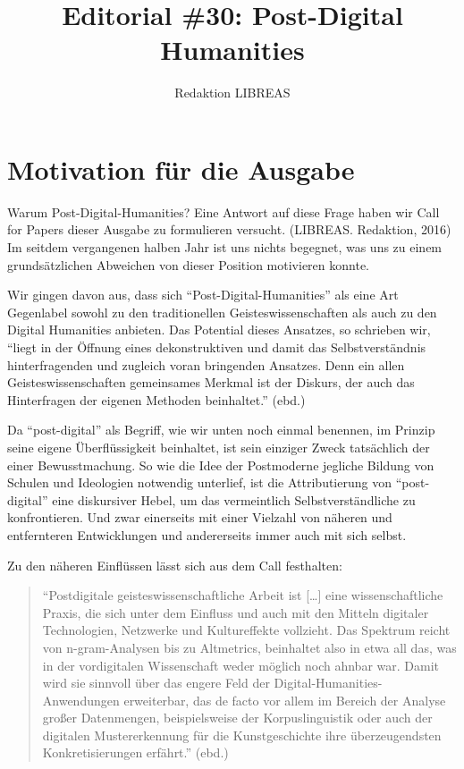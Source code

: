 \documentclass[a4paper,
fontsize=11pt,
oneside,
numbers=noperiodatend,
parskip=half-,
bibliography=totoc,
final
]{scrartcl}
\title{\LARGE{Editorial \#30: Post-Digital Humanities}} %
\author{Redaktion LIBREAS} %
\date{}
\begin{document}
\maketitle
\thispagestyle{fancyplain} 


\section*{Motivation für die
Ausgabe}\label{motivation-fuxfcr-die-ausgabe}

Warum Post-Digital-Humanities? Eine Antwort auf diese Frage haben wir
Call for Papers dieser Ausgabe zu formulieren versucht. (LIBREAS.
Redaktion, 2016) Im seitdem vergangenen halben Jahr ist uns nichts
begegnet, was uns zu einem grundsätzlichen Abweichen von dieser Position
motivieren konnte.

Wir gingen davon aus, dass sich \enquote{Post-Digital-Humanities} als
eine Art Gegenlabel sowohl zu den traditionellen Geisteswissenschaften
als auch zu den Digital Humanities anbieten. Das Potential dieses
Ansatzes, so schrieben wir, \enquote{liegt in der Öffnung eines
dekonstruktiven und damit das Selbstverständnis hinterfragenden und
zugleich voran bringenden Ansatzes. Denn ein allen Geisteswissenschaften
gemeinsames Merkmal ist der Diskurs, der auch das Hinterfragen der
eigenen Methoden beinhaltet.} (ebd.)

Da \enquote{post-digital} als Begriff, wie wir unten noch einmal
benennen, im Prinzip seine eigene Überflüssigkeit beinhaltet, ist sein
einziger Zweck tatsächlich der einer Bewusstmachung. So wie die Idee der
Postmoderne jegliche Bildung von Schulen und Ideologien notwendig
unterlief, ist die Attributierung von \enquote{post-digital} eine
diskursiver Hebel, um das vermeintlich Selbstverständliche zu
konfrontieren. Und zwar einerseits mit einer Vielzahl von näheren und
entfernteren Entwicklungen und andererseits immer auch mit sich selbst.

Zu den näheren Einflüssen lässt sich aus dem Call festhalten:

\begin{quote}
\enquote{Postdigitale geisteswissenschaftliche Arbeit ist {[}\ldots{}{]}
eine wissenschaftliche Praxis, die sich unter dem Einfluss und auch mit
den Mitteln digitaler Technologien, Netzwerke und Kultureffekte
vollzieht. Das Spektrum reicht von n-gram-Analysen bis zu Altmetrics,
beinhaltet also in etwa all das, was in der vordigitalen Wissenschaft
weder möglich noch ahnbar war. Damit wird sie sinnvoll über das engere
Feld der Digital-Humanities-Anwendungen erweiterbar, das de facto vor
allem im Bereich der Analyse großer Datenmengen, beispielsweise der
Korpuslinguistik oder auch der digitalen Mustererkennung für die
Kunstgeschichte ihre überzeugendsten Konkretisierungen erfährt.} (ebd.)
\end{quote}
\end{document}
